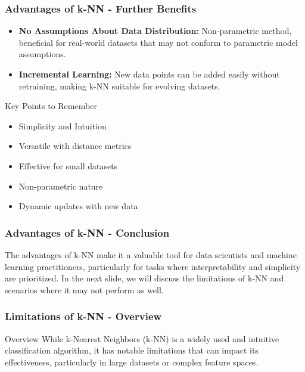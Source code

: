 \documentclass[aspectratio=169]{beamer}
\begin{document}
\begin{frame}[fragile]
    \frametitle{Advantages of k-NN - Further Benefits}
    \begin{itemize}
        \item \textbf{No Assumptions About Data Distribution:} Non-parametric method, beneficial for real-world datasets that may not conform to parametric model assumptions.
        \item \textbf{Incremental Learning:} New data points can be added easily without retraining, making k-NN suitable for evolving datasets.
    \end{itemize}
    
    \begin{block}{Key Points to Remember}
        \begin{itemize}
            \item Simplicity and Intuition
            \item Versatile with distance metrics
            \item Effective for small datasets
            \item Non-parametric nature
            \item Dynamic updates with new data
        \end{itemize}
    \end{block}
\end{frame}

\begin{frame}[fragile]
    \frametitle{Advantages of k-NN - Conclusion}
    The advantages of k-NN make it a valuable tool for data scientists and machine learning practitioners, particularly for tasks where interpretability and simplicity are prioritized. In the next slide, we will discuss the limitations of k-NN and scenarios where it may not perform as well.
\end{frame}

\begin{frame}[fragile]
    \frametitle{Limitations of k-NN - Overview}
    \begin{block}{Overview}
        While k-Nearest Neighbors (k-NN) is a widely used and intuitive classification algorithm, it has notable limitations that can impact its effectiveness, particularly in large datasets or complex feature spaces.
    \end{block}
\end{frame}
\end{document}
